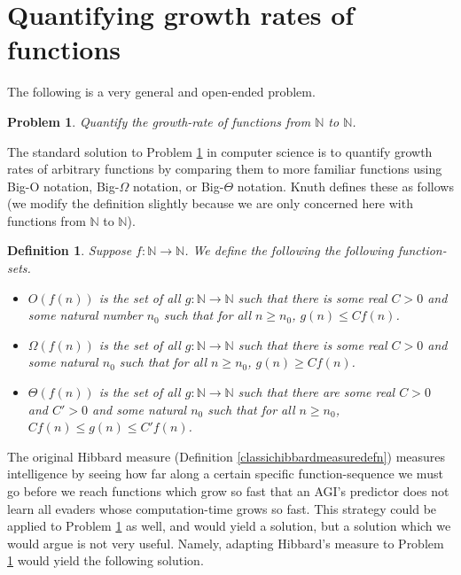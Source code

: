 \documentclass{article}
\newtheorem{definition}[theorem]{Definition}
\newtheorem{problem}[theorem]{Problem}
\begin{document}
\section{Quantifying growth rates of functions}
\label{growthratesection}

The following is a very general and open-ended problem.

\begin{problem}
\label{bigoproblem}
    Quantify the growth-rate of functions from $\mathbb N$ to $\mathbb N$.
\end{problem}

The standard solution to Problem \ref{bigoproblem} in computer science is to quantify
growth rates of arbitrary functions by comparing them to more familiar functions using
Big-O notation, Big-$\Omega$ notation, or Big-$\Theta$ notation.
Knuth defines \cite{knuth1976big} these as follows (we modify the definition slightly because
we are only concerned here with functions from $\mathbb N$ to $\mathbb N$).

\begin{definition}
\label{bigodefn}
    Suppose $f:\mathbb N\to\mathbb N$. We define the following the following function-sets.
    \begin{itemize}
        \item
        $O(f(n))$ is the set of all $g:\mathbb N\to\mathbb N$ such that
        there is some real $C>0$ and some natural number $n_0$ such that
        for all $n\geq n_0$, $g(n)\leq Cf(n)$.
        \item
        $\Omega(f(n))$ is the set of all $g:\mathbb N\to\mathbb N$ such that
        there is some real $C>0$ and some natural $n_0$ such that
        for all $n\geq n_0$, $g(n)\geq Cf(n)$.
        \item
        $\Theta(f(n))$ is the set of all $g:\mathbb N\to\mathbb N$ such that
        there are some real $C>0$ and $C'>0$ and some natural $n_0$ such that
        for all $n\geq n_0$, $Cf(n)\leq g(n)\leq C'f(n)$.
    \end{itemize}
\end{definition}

The original Hibbard measure (Definition \ref{classichibbardmeasuredefn}) measures
intelligence by seeing how far along a certain specific function-sequence we must go
before we reach functions which grow so fast that an AGI's predictor does not learn
all evaders whose computation-time grows so fast. This strategy could be applied to
Problem \ref{bigoproblem} as well, and would yield a solution, but a solution which we
would argue is not very useful. Namely, adapting Hibbard's measure to
Problem \ref{bigoproblem} would yield the following solution.
\end{document}
